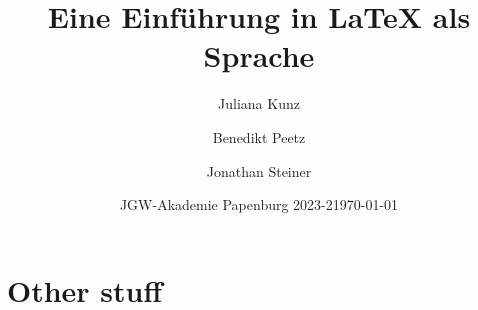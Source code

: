 \documentclass{beamer}
\title[\LaTeX{} Einführung]{Eine Einführung in \LaTeX{} als Sprache}
\author[Juliana, Benedikt, Jonathan]{Juliana Kunz \and Benedikt Peetz \and Jonathan Steiner}
\date[JGW 2023-2]{JGW-Akademie Papenburg 2023-2}
\date{\today}
\begin{document}
    \maketitle

    
    

    \section{Other stuff}
\end{document}
